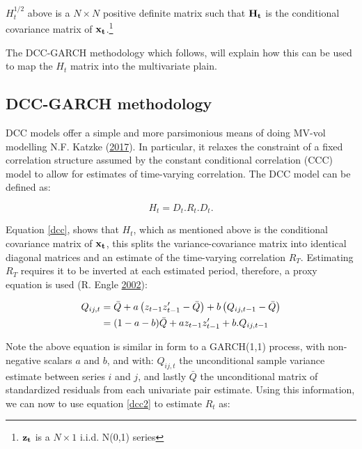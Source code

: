 \documentclass[11pt,preprint, authoryear]{elsarticle}
\numberwithin{equation}{section}
\numberwithin{figure}{section}
\numberwithin{table}{section}
\let\rmarkdownfootnote\footnote%
\def\footnote{\protect\rmarkdownfootnote}
\begin{document}
\(H_t^{1/2}\) above is a \(N\times N\) positive definite matrix such
that \(\bf{H_t}\) is the conditional covariance matrix of
\(\bf{x_t}\).\footnote{\(\bf{z_t}\) is a \(N\times 1\) i.i.d. N(0,1)
  series}

The DCC-GARCH methodology which follows, will explain how this can be
used to map the \(H_t\) matrix into the multivariate plain.

\subsection{\texorpdfstring{DCC-GARCH methodology
\label{garch}}{DCC-GARCH methodology }}\label{dcc-garch-methodology}

DCC models offer a simple and more parsimonious means of doing MV-vol
modelling N.F. Katzke (\protect\hyperlink{ref-Texevier}{2017}). In
particular, it relaxes the constraint of a fixed correlation structure
assumed by the constant conditional correlation (CCC) model to allow for
estimates of time-varying correlation. The DCC model can be defined as:

\begin{equation} \label{dcc}
H_t = D_t.R_t.D_t.
\end{equation}

Equation \ref{dcc}, shows that \(H_t\), which as mentioned above is the
conditional covariance matrix of \(\bf{x_t}\), this splits the
variance-covariance matrix into identical diagonal matrices and an
estimate of the time-varying correlation \(R_T\). Estimating \(R_T\)
requires it to be inverted at each estimated period, therefore, a proxy
equation is used (R. Engle
\protect\hyperlink{ref-engle2002dynamic}{2002}):

\begin{align}  \label{dcc2}
Q_{ij,t} &= \bar Q + a\left(z_{t - 1}z'_{t - 1} - \bar{Q} \right) + b\left( Q_{ij, t - 1} - \bar{Q} \right) \hfill \\ \notag
                            &= (1 - a - b)\bar{Q} + az_{t - 1}z'_{t - 1} + b.Q_{ij, t - 1} \notag
                            \end{align}

Note the above equation is similar in form to a GARCH(1,1) process, with
non-negative scalars \(a\) and \(b\), and with: \(Q_{ij, t}\) the
unconditional sample variance estimate between series \(i\) and \(j\),
and lastly \(\bar{Q}\) the unconditional matrix of standardized
residuals from each univariate pair estimate. Using this information, we
can now to use equation \ref{dcc2} to estimate \(R_t\) as:
\end{document}
